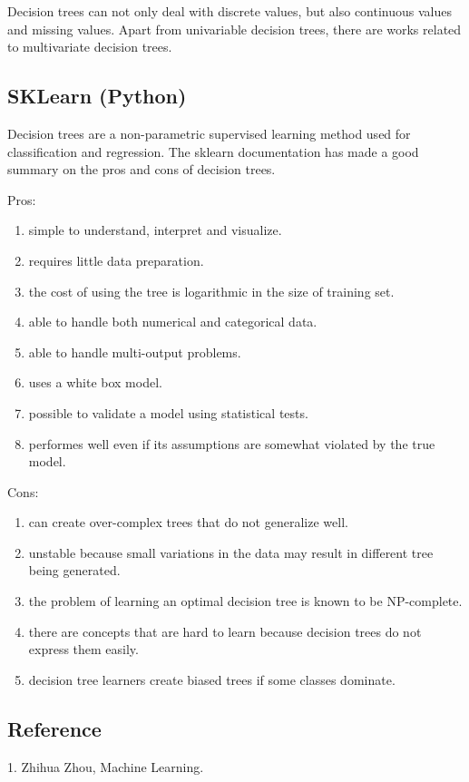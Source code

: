 Decision trees can not only deal with discrete values, but also continuous
values and missing values. Apart from univariable decision trees, there are
works related to multivariate decision trees.

\subsection{SKLearn (Python)}

Decision trees are a non-parametric supervised learning method used for
classification and regression. The sklearn documentation has made a good
summary on the pros and cons of decision trees.

Pros: \begin{enumerate}
\item simple to understand, interpret and visualize.
\item requires little data preparation.
\item the cost of using the tree is logarithmic in the size of training set.
\item able to handle both numerical and categorical data.
\item able to handle multi-output problems.
\item uses a white box model.
\item possible to validate a model using statistical tests.
\item performes well even if its assumptions are somewhat violated by the true model.
\end{enumerate}

Cons: \begin{enumerate}
\item can create over-complex trees that do not generalize well.
\item unstable because small variations in the data may result in different tree being generated.
\item the problem of learning an optimal decision tree is known to be NP-complete.
\item there are concepts that are hard to learn because decision trees do not express them easily.
\item decision tree learners create biased trees if some classes dominate.
\end{enumerate}

\subsection{Reference}

1. Zhihua Zhou, Machine Learning.
